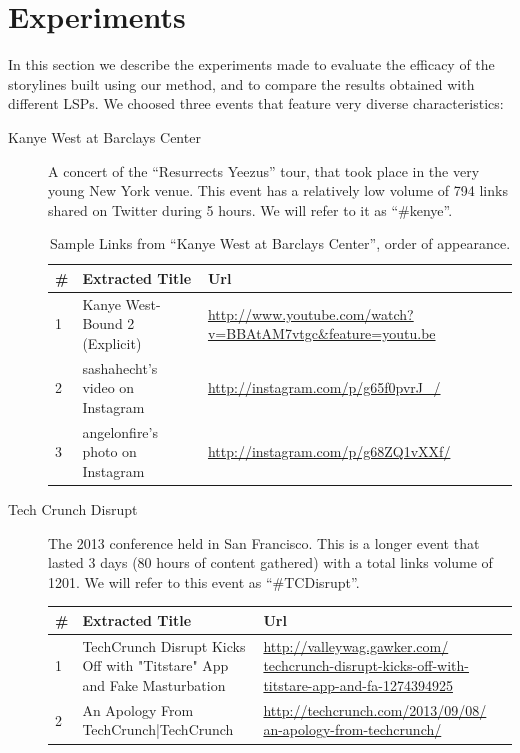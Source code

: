 \documentclass{sig-alternate}
\begin{document}
\section{Experiments}
\label{sec:experiments}
In this section we describe the experiments made to evaluate the efficacy of the storylines built using our method, and to compare the results obtained with different LSPs. We choosed three events that feature very diverse characteristics:
\begin{description}
\item[Kanye West at Barclays Center] A concert of the ``Resurrects Yeezus'' tour, that took place in the very young New York venue. This event has a relatively low volume of 794 links shared on Twitter during 5 hours. We will refer to it as ``\#kenye''.
\begin{table}
\begin{tabular}{| p{0.5cm} | p{3.5cm} | p{3.5cm} |}
  \hline
  \textbf{\#} & \textbf{Extracted Title} & \textbf{Url} \\
  \hline
  1 & Kanye West-Bound 2 (Explicit) & \url{http://www.youtube.com/watch?v=BBAtAM7vtgc\&feature=youtu.be} \\
\hline
  2 & sashahecht's video on Instagram & \url{http://instagram.com/p/g65f0pvrJ\_/} \\
\hline
  3 & angelonfire's photo on Instagram & \url{http://instagram.com/p/g68ZQ1vXXf/} \\
\hline
\end{tabular}
\caption{Sample Links from ``Kanye West at Barclays Center'', order of appearance.}
\label{table:kanye}
\end{table}
\item[Tech Crunch Disrupt] The 2013 conference held in San Francisco. This is a longer event that lasted 3 days (80 hours of content gathered) with a total links volume of 1201. We will refer to this event as ``\#TCDisrupt''.
\begin{table}
\begin{tabular}{| p{0.5cm} | p{3.5cm} | p{3.5cm} |}
  \hline
  \textbf{\#} & \textbf{Extracted Title} & \textbf{Url} \\
  \hline
  1 & TechCrunch Disrupt Kicks Off with "Titstare" App and Fake Masturbation & \url{http://valleywag.gawker.com/ techcrunch-disrupt-kicks-off-with-titstare-app-and-fa-1274394925} \\
\hline
  2 & An Apology From TechCrunch|TechCrunch & \url{http://techcrunch.com/2013/09/08/ an-apology-from-techcrunch/} \\

\end{tabular}
\end{table}
\end{description}
\end{document}
